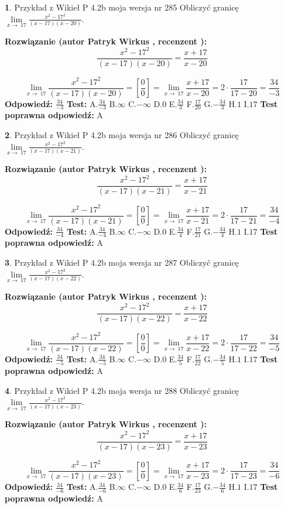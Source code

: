 \documentclass[12pt, a4paper]{article}
\theoremstyle{definition} %
\newtheorem{zad}{}
\newcommand{\zadStart}[1]{\begin{zad}#1\newline}
\newcommand{\zadStop}{\end{zad}}
\newcommand{\rozwStart}[2]{\noindent \textbf{Rozwiązanie (autor #1 , recenzent #2): }\newline}
\newcommand{\rozwStop}{\newline}
\newcommand{\odpStart}{\noindent \textbf{Odpowiedź:}\newline}
\newcommand{\odpStop}{\newline}
\newcommand{\testStart}{\noindent \textbf{Test:}\newline}
\newcommand{\testStop}{\newline}
\newcommand{\kluczStart}{\noindent \textbf{Test poprawna odpowiedź:}\newline}
\newcommand{\kluczStop}{\newline}
\begin{document}
\zadStart{Przykład z Wikieł P 4.2b moja wersja nr 285}
Obliczyć granicę $\lim\limits_{x\to\ 17}\frac{x^{2}-17^{2}}{(x-17)(x-20)}$.
\zadStop
\rozwStart{Patryk Wirkus}{}
$$\frac{x^{2}-17^{2}}{(x-17)(x-20)}=\frac{x+17}{x-20}$$

$$\lim\limits_{x\to\ 17}\frac{x^{2}-17^{2}}{(x-17)(x-20)}=[\frac{0}{0}]=\lim\limits_{x\to\ 17}\frac{x+17}{x-20}=2 \cdot \frac{17}{17-20} = \frac{34}{-3}$$
\rozwStop
\odpStart
$\frac{34}{-3}$
\odpStop
\testStart
A.$\frac{34}{-3}$
B.$\infty$
C.$-\infty$
D.$0$
E.$\frac{34}{3}$
F.$\frac{17}{20}$
G.$-\frac{34}{3}$
H.$1$
I.$17$
\testStop
\kluczStart
A
\kluczStop



\zadStart{Przykład z Wikieł P 4.2b moja wersja nr 286}
Obliczyć granicę $\lim\limits_{x\to\ 17}\frac{x^{2}-17^{2}}{(x-17)(x-21)}$.
\zadStop
\rozwStart{Patryk Wirkus}{}
$$\frac{x^{2}-17^{2}}{(x-17)(x-21)}=\frac{x+17}{x-21}$$

$$\lim\limits_{x\to\ 17}\frac{x^{2}-17^{2}}{(x-17)(x-21)}=[\frac{0}{0}]=\lim\limits_{x\to\ 17}\frac{x+17}{x-21}=2 \cdot \frac{17}{17-21} = \frac{34}{-4}$$
\rozwStop
\odpStart
$\frac{34}{-4}$
\odpStop
\testStart
A.$\frac{34}{-4}$
B.$\infty$
C.$-\infty$
D.$0$
E.$\frac{34}{4}$
F.$\frac{17}{21}$
G.$-\frac{34}{4}$
H.$1$
I.$17$
\testStop
\kluczStart
A
\kluczStop



\zadStart{Przykład z Wikieł P 4.2b moja wersja nr 287}
Obliczyć granicę $\lim\limits_{x\to\ 17}\frac{x^{2}-17^{2}}{(x-17)(x-22)}$.
\zadStop
\rozwStart{Patryk Wirkus}{}
$$\frac{x^{2}-17^{2}}{(x-17)(x-22)}=\frac{x+17}{x-22}$$

$$\lim\limits_{x\to\ 17}\frac{x^{2}-17^{2}}{(x-17)(x-22)}=[\frac{0}{0}]=\lim\limits_{x\to\ 17}\frac{x+17}{x-22}=2 \cdot \frac{17}{17-22} = \frac{34}{-5}$$
\rozwStop
\odpStart
$\frac{34}{-5}$
\odpStop
\testStart
A.$\frac{34}{-5}$
B.$\infty$
C.$-\infty$
D.$0$
E.$\frac{34}{5}$
F.$\frac{17}{22}$
G.$-\frac{34}{5}$
H.$1$
I.$17$
\testStop
\kluczStart
A
\kluczStop



\zadStart{Przykład z Wikieł P 4.2b moja wersja nr 288}
Obliczyć granicę $\lim\limits_{x\to\ 17}\frac{x^{2}-17^{2}}{(x-17)(x-23)}$.
\zadStop
\rozwStart{Patryk Wirkus}{}
$$\frac{x^{2}-17^{2}}{(x-17)(x-23)}=\frac{x+17}{x-23}$$

$$\lim\limits_{x\to\ 17}\frac{x^{2}-17^{2}}{(x-17)(x-23)}=[\frac{0}{0}]=\lim\limits_{x\to\ 17}\frac{x+17}{x-23}=2 \cdot \frac{17}{17-23} = \frac{34}{-6}$$
\rozwStop
\odpStart
$\frac{34}{-6}$
\odpStop
\testStart
A.$\frac{34}{-6}$
B.$\infty$
C.$-\infty$
D.$0$
E.$\frac{34}{6}$
F.$\frac{17}{23}$
G.$-\frac{34}{6}$
H.$1$
I.$17$
\testStop
\kluczStart
A
\kluczStop
\end{document}
